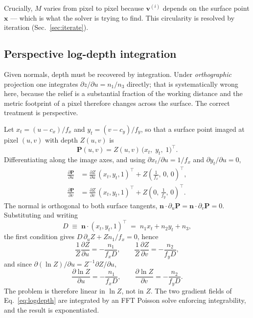 \documentclass[journal,10pt]{IEEEtran}
\newcommand{\vecn}{\bm{n}}
\newcommand{\vecx}{\bm{x}}
\newcommand{\vecP}{\bm{P}}
\begin{document}
Crucially, $M$ varies from pixel to pixel because $\bm{v}^{(i)}$ depends on the
surface point $\vecx$ --- which is what the solver is trying to find. This
circularity is resolved by iteration (Sec.~\ref{sec:iterate}).

\subsection{Perspective log-depth integration}\label{sec:logdepth}
Given normals, depth must be recovered by integration. Under \emph{orthographic}
projection one integrates $\partial z/\partial u = n_1/n_3$ directly; that is
systematically wrong here, because the relief is a substantial fraction of the
working distance and the metric footprint of a pixel therefore changes across
the surface. The correct treatment is perspective.

Let $x_t = (u-c_x)/f_x$ and $y_t = (v-c_y)/f_y$, so that a surface point imaged
at pixel $(u,v)$ with depth $Z(u,v)$ is
\begin{equation}
\vecP(u,v) = Z(u,v)\,\bigl(x_t,\; y_t,\; 1\bigr)^{\!\top}.
\end{equation}
Differentiating along the image axes, and using
$\partial x_t/\partial u = 1/f_x$ and $\partial y_t/\partial u = 0$,
\begin{align}
\frac{\partial \vecP}{\partial u}
&= \frac{\partial Z}{\partial u}\,(x_t, y_t, 1)^{\!\top}
 + Z\left(\tfrac{1}{f_x},\,0,\,0\right)^{\!\top}, \\
\frac{\partial \vecP}{\partial v}
&= \frac{\partial Z}{\partial v}\,(x_t, y_t, 1)^{\!\top}
 + Z\left(0,\,\tfrac{1}{f_y},\,0\right)^{\!\top}.
\end{align}
The normal is orthogonal to both surface tangents,
$\vecn\cdot\partial_u\vecP = \vecn\cdot\partial_v\vecP = 0$. Substituting and
writing
\begin{equation}
D \;\equiv\; \vecn\cdot(x_t, y_t, 1)^{\!\top} \;=\; n_1 x_t + n_2 y_t + n_3 ,
\label{eq:Ddef}
\end{equation}
the first condition gives $D\,\partial_u Z + Z n_1/f_x = 0$, hence
\begin{equation}
\frac{1}{Z}\frac{\partial Z}{\partial u} = -\frac{n_1}{f_x D},
\qquad
\frac{1}{Z}\frac{\partial Z}{\partial v} = -\frac{n_2}{f_y D},
\end{equation}
and since $\partial(\ln Z)/\partial u = Z^{-1}\partial Z/\partial u$,
\begin{equation}
\boxed{\;
\frac{\partial \ln Z}{\partial u} = -\frac{n_1}{f_x D},
\qquad
\frac{\partial \ln Z}{\partial v} = -\frac{n_2}{f_y D}. \;}
\label{eq:logdepth}
\end{equation}
The problem is therefore linear in $\ln Z$, not in $Z$. The two gradient fields
of Eq.~\eqref{eq:logdepth} are integrated by an FFT Poisson solve enforcing
integrability, and the result is exponentiated.
\end{document}
